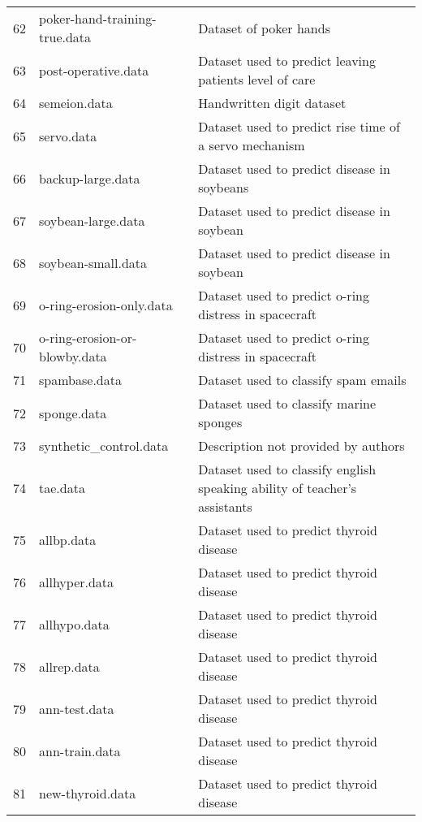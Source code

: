 \begin{table}
{\begin{tabular}{lll}
62 &            poker-hand-training-true.data & Dataset of poker hands\\
63 &                      post-operative.data & Dataset used to predict leaving patients level of care\\
64 &                             semeion.data & Handwritten digit dataset\\
65 &                               servo.data & Dataset used to predict rise time of a servo mechanism\\
66 &                        backup-large.data & Dataset used to predict disease in soybeans\\
67 &                       soybean-large.data & Dataset used to predict disease in soybean\\
68 &                       soybean-small.data & Dataset used to predict disease in soybean\\
69 &                 o-ring-erosion-only.data & Dataset used to predict o-ring distress in spacecraft\\
70 &            o-ring-erosion-or-blowby.data & Dataset used to predict o-ring distress in spacecraft\\
71 &                            spambase.data & Dataset used to classify spam emails\\
72 &                              sponge.data & Dataset used to classify marine sponges\\
73 &                   synthetic\_control.data & Description not provided by authors\\
74 &                                 tae.data & Dataset used to classify english speaking ability of teacher's assistants\\
75 &                               allbp.data & Dataset used to predict thyroid disease\\
76 &                            allhyper.data & Dataset used to predict thyroid disease\\
77 &                             allhypo.data & Dataset used to predict thyroid disease\\
78 &                              allrep.data & Dataset used to predict thyroid disease\\
79 &                            ann-test.data & Dataset used to predict thyroid disease\\
80 &                           ann-train.data & Dataset used to predict thyroid disease\\
81 &                         new-thyroid.data & Dataset used to predict thyroid disease\\

\end{tabular}}
\end{table}
